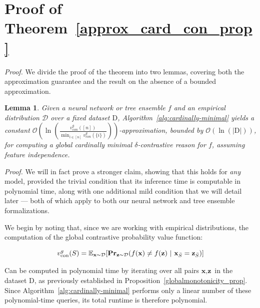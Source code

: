 \documentclass{article}
\newtheorem{lemma}{Lemma}
\newcommand{\z}{\textbf{z}}
\newcommand{\x}{\textbf{x}}
\begin{document}



\section{Proof of Theorem~\ref{approx_card_con_prop}}
\label{approx_card_con_prop_sec}

\approxcardcon*

\emph{Proof.} We divide the proof of the theorem into two lemmas, covering both the approximation guarantee and the result on the absence of a bounded approximation.


\begin{lemma}
\label{approx_card_con_lemma}
    Given a neural network or tree ensemble $f$ and an empirical distribution $\mathcal{D}$ over a fixed dataset $\text{D}$, Algorithm~\ref{alg:cardinally-minimal} yields a \emph{constant} $\mathcal{O}\left(\ln\left(\frac{v^g_{con}([n])}{\min_{i \in [n]} v^g_{con}(\{i\})}\right)\right)$-approximation, bounded by $\mathcal{O}(\ln(|\text{D}|))$, for computing a global cardinally minimal $\delta$-contrastive reason for $f$, assuming feature independence.
\end{lemma}


\emph{Proof.} We will in fact prove a stronger claim, showing that this holds for \emph{any} model, provided the trivial condition that its inference time is computable in polynomial time, along with one additional mild condition that we will detail later --- both of which apply to both our neural network and tree ensemble formalizations.

We begin by noting that, since we are working with empirical distributions, the computation of the global contrastive probability value function:

\begin{equation}
v^g_{\text{con}}(S)=\mathbb{E}_{\x\sim\mathcal{D}}[
\textbf{Pr}_{\z\sim\mathcal{D}}(f(\x)\neq f(\z) \ | \ \x_{\Bar{S}}=\z_{\Bar{S}})]
\end{equation}

Can be computed in polynomial time by iterating over all pairs $\x, \z$ in the dataset D, as previously established in Proposition~\ref{globalmonotonicity_prop}. Since Algorithm~\ref{alg:cardinally-minimal} performs only a linear number of these polynomial-time queries, its total runtime is therefore polynomial.
\end{document}
